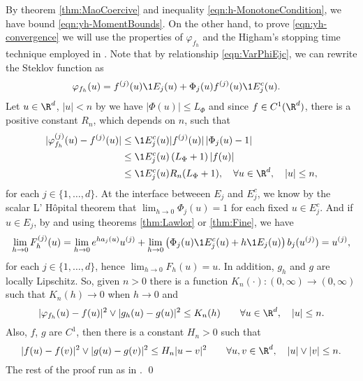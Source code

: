 \begin{pf}
	By theorem \ref{thm:MaoCoercive} and inequality \eqref{eqn:h-MonotoneCondition}, 
	we have	 bound \eqref{eqn:yh-MomentBounds}.
	On the other hand, to prove \eqref{eqn:yh-convergence} we will use the properties of 
	$\varphi_{f_h}$ and the Higham's stopping time technique employed in \cite[Thm 2.2]{Higham2002b}. 
	Note that by relationship \eqref{eqn:VarPhiEjc}, we can rewrite the Steklov function  as
	\begin{align}\label{fo}
		\varphi_{f_h}(u) 
			&=  f^{(j)}(u) \1{E_j}(u) +\Phi_j(u) f^{(j)}(u) \1{E_j^c}(u) .
	\end{align}
	 Let $u\in \R^d$, $|u|<n$ by  we have $|\Phi(u)|\leq L_{\Phi}$ and since $f \in C^1(\R^d)$, there is a 
	 positive  constant $R_n$, which depends on $n$, such that 
	\begin{align*}	
		|\varphi_{f_h}^{(j)}(u) - f^{(j)}(u)|
		&\leq
			\1{E_j^c}(u)
			|f^{(j)}(u)|
			\left|
				\Phi_j(u) - 1
			\right| \notag \\
		&\leq
			\1{E_j^c}(u)
			\left(
				L_{\Phi} + 1
			\right)
			|f(u)|	 \notag \\
		&\leq
		\1{E_j^c}(u) R_n(L_{\Phi}+1), \quad \forall u \in \R^d, \quad |u|\leq n,
	\end{align*}
	for each $j\in \{1,\dots, d\}$. At the interface betweeen $E_j$ and $E_j^c$, 
	we know by the scalar L' H\^{o}pital theorem that 
	$ \lim_{h\to 0} \Phi_j(u) = 1$ for each fixed $u\in E_j^c$.
	And if $u\in E_j$,  by  and using   
	theorems \ref{thm:Lawlor} or \ref{thm:Fine}, we have 
	\begin{equation*}
	\lim_{h \to 0} F_h^{(j)}(u)
		=
		\lim_{h \to 0}
			e^{ha_j(u)} u^{(j)} + 
		\lim_{h \to 0}
			\left( \Phi_j(u)
				\1{E_j^c}(u)
				+h \1{E_j}(u)
			\right)
			b_j(u^{(j)}) 
		= u^{(j)},
	\end{equation*}
	for each $j \in \{1, \dots , d\}$, hence
	$%
		\displaystyle
		\lim_{h\to 0} F_h(u)=u.
	$ %
	In addition, $g_h$ and $g$ are locally Lipschitz. So, given $n>0$ there is  a function 
	$K_n(\cdot):(0,\infty)\to (0,\infty)$ such that
	$K_n(h)\to 0$ when $h \to 0$ and
	\begin{equation}\label{eqn:PhihGhKRhBound}
		|\varphi_{f_h}(u)-f(u)|^2 \vee |g_h(u)-g(u)|^2
		\leq K_n(h) \qquad \forall u\in \R^d, \quad |u| \leq n.
	\end{equation}
	Also, $f$, $g$ are $C^{1}$, then there is  a constant $H_n>0$ such that
	\begin{equation}\label{eqn:f-gHRBound}
		|f(u)-f(v)|^2 \vee |g(u)-g(v)|^2
		\leq H_n |u-v|^2\qquad \forall u,v \in \R^d, \quad|u|\vee |v| \leq n.
	\end{equation}
	The rest of the proof run as in \citep[Lem. 3.6]{Higham2002b}. \qed
\end{pf}